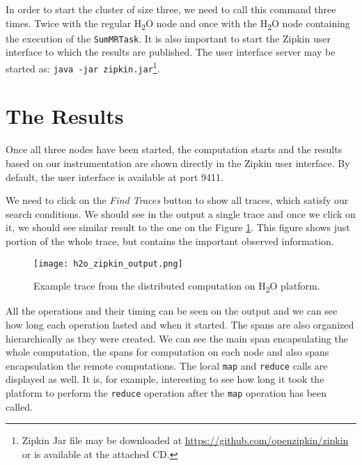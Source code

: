 In order to start the cluster of size three, we need to call this command three times. Twice with the regular H\textsubscript{2}O node and once with the H\textsubscript{2}O node containing the execution of the \texttt{SumMRTask}. It is also important to start the Zipkin user interface to which the results are published. The user interface server may be started as: \texttt{java -jar zipkin.jar}\footnote{Zipkin Jar file may be downloaded at \url{https://github.com/openzipkin/zipkin} or is available at the attached CD.}.
\section{The Results}
Once all three nodes have been started, the computation starts and the results based on our instrumentation are shown directly in the Zipkin user interface. By default, the user interface is available at port 9411.

We need to click on the \textit{Find Traces} button to show all traces, which satisfy our search conditions. We should see in the output a single trace and once we click on it, we should see similar result to the one on the Figure \ref{h2o_zipkin_output}. This figure shows just portion of the whole trace, but contains the important observed information.
	\begin{figure}
		\centering
		\texttt{[image: h2o\_zipkin\_output.png]}
		\caption{Example trace from the distributed computation on H\textsubscript{2}O platform.}
		\label{h2o_zipkin_output}
	\end{figure}

All the operations and their timing can be seen on the output and we can see how long each operation lasted and when it started. The spans are also organized hierarchically as they were created. We can see the main span encapsulating the whole computation, the spans for computation on each node and also spans encapsulation the remote computations. The local \texttt{map} and \texttt{reduce} calls are displayed as well. It is, for example, interesting to see how long it took the platform to perform the \texttt{reduce} operation after the \texttt{map} operation has been called.